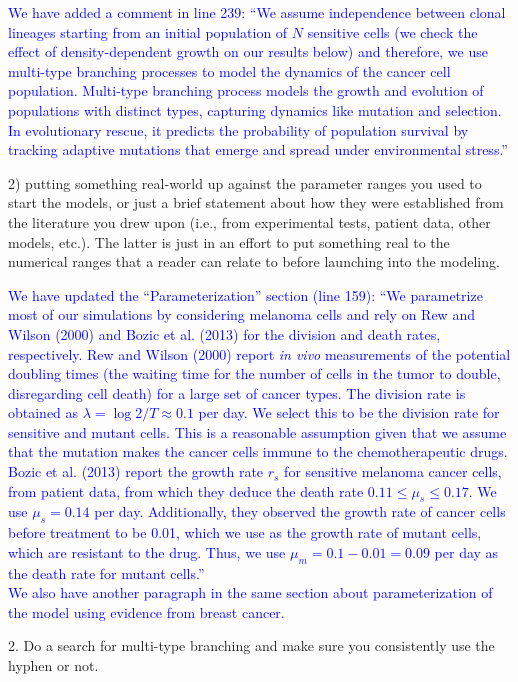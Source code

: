 \documentclass[12pt]{extarticle}
\renewcommand{\Delta}{r}
\begin{document}
\textcolor{blue}{ %
We have added a comment in line 239: ``We assume independence between clonal lineages starting from an initial population of $N$ sensitive cells (we check the effect of density-dependent growth on our results below) and therefore, we use multi-type branching processes to model the dynamics of the cancer cell population. Multi-type branching process models the growth and evolution of populations with distinct types, capturing dynamics like mutation and selection. In evolutionary rescue, it predicts the probability of population survival by tracking adaptive mutations that emerge and spread under environmental stress.''
}

2) putting something real-world up against the parameter ranges you used to start the models, or just a brief statement about how they were established from the literature you drew upon (i.e., from experimental tests, patient data, other models, etc.). The latter is just in an effort to put something real to the numerical ranges that a reader can relate to before launching into the modeling.

\textcolor{blue}{ %
We have updated the ``Parameterization'' section (line 159): ``We parametrize most of our simulations by considering melanoma cells and rely on Rew and Wilson (2000) and Bozic et al. (2013) for the division and death rates, respectively.  
Rew and Wilson (2000)  report \emph{in vivo} measurements of the potential doubling times (the waiting time for the number of cells in the tumor to double, disregarding cell death) for a large set of cancer types. The division rate is obtained as $\lambda=\log{2} / T \approx 0.1$ per day. We select this to be the division rate for sensitive and mutant cells. This is a reasonable assumption given that we assume that the mutation makes the cancer cells immune to the chemotherapeutic drugs. 
Bozic et al. (2013) report the growth rate $\Delta_s$ for sensitive melanoma cancer cells, from patient data, from which they deduce the death rate $0.11 \le \mu_s \le 0.17$. We use  $\mu_s=0.14$ per day. Additionally, they observed the growth rate of cancer cells before treatment to be 0.01, which we use as the growth rate of mutant cells, which are resistant to the drug. Thus, we use $\mu_m=0.1-0.01=0.09$ per day as the death rate for mutant cells.'' \\
We also have another paragraph in the same section about parameterization of the model using evidence from breast cancer.
} 

2. Do a search for multi-type branching and make sure you consistently use the hyphen or not.
\end{document}
